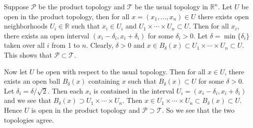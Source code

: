 
\begin{solution}
    Suppose $\mathscr{P}$ be the product topology and
    $\mathscr{T}$ be the usual topology in $\mathbb{R}^n$.
    Let $U$ be open in the product topology, then
    for all $x=(x_1,\ldots,x_n) \in U$ there exists 
    open neighborhoods $U_i\in \mathbb{R}$ such that
    $x_i\in U_i$ and $U_1\times \cdots 
    \times U_n \subset U$. Then for all $x_i$, there
    exists an open interval $(x_i-\delta_i,x_i+\delta_i)$
    for some $\delta_i>0$.
    Let $\delta=\min\{\delta_i\}$ taken over
    all $i$ from 1 to $n$. Clearly, $\delta>0$  and 
    $x\in B_\delta(x)\subset U_1\times \cdots 
    \times U_n \subset U$. This shows that
    $\mathscr{P}\subset \mathscr{T}$.

    \vspace*{2mm}
    Now let $U$ be open with respect to the usual
    topology. Then for all $x\in U$, there exists an
    open ball $B_\delta(x)$ containing $x$ such that
    $B_\delta(x)\subset U$ for some $\delta>0$.
    Let $\delta_i = \delta/\sqrt{2}$. Then each $x_i$
    is contained in the interval
    $U_i= (x_i-\delta_i,x_i+\delta_i)$ and we see that
    $B_\delta(x) \supset U_1\times \cdots 
    \times U_n$. Then $x\in U_1\times \cdots 
    \times U_n \subset B_\delta(x) \subset U$. Hence
    $U$ is open in the product topology and
     $\mathscr{P}\supset \mathscr{T}$. So we see that the
     two topologies agree.
\end{solution}